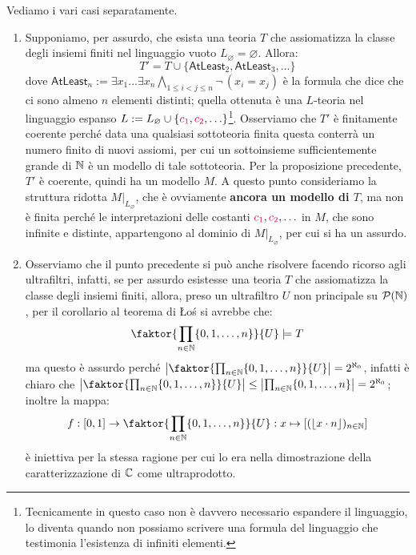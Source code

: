 \begin{soln}
    Vediamo i vari casi separatamente.
    \begin{enumerate}
        \item Supponiamo, per assurdo, che esista una teoria $T$ che assiomatizza la classe degli insiemi finiti nel linguaggio vuoto $L_\varnothing = \varnothing$. Allora:
        \[ T' = T \cup \{\mathsf{AtLeast}_2, \mathsf{AtLeast}_3, \ldots\} 
        \]
        dove $\mathsf{AtLeast}_n := \exists x_1 \ldots \exists x_n \bigwedge_{1 \leq i < j \leq n} \neg\, (x_i = x_j)$ è la formula che dice che ci sono almeno $n$ elementi distinti; quella ottenuta è una $L$-teoria nel linguaggio espanso $L := L_\varnothing \cup \{\textcolor{purple}{c_1}, \textcolor{purple}{c_2}, \ldots\}$\footnote{Tecnicamente in questo caso non è davvero necessario espandere il linguaggio, lo diventa quando non possiamo scrivere 
        una formula del linguaggio che testimonia l'esistenza di infiniti elementi.}. Osserviamo che $T'$ è finitamente coerente perché data una qualsiasi sottoteoria finita 
        questa conterrà un numero finito di nuovi assiomi, per cui un sottoinsieme sufficientemente grande di $\mathbb N$ è un modello di tale sottoteoria. Per la proposizione precedente, $T'$ è coerente, quindi ha un modello $M$. 
        A questo punto consideriamo la struttura ridotta $M|_{L_\varnothing}$, che è ovviamente \textbf{ancora un modello di $T$}, ma non è finita perché le interpretazioni delle costanti $\textcolor{purple}{c_1}, \textcolor{purple}{c_2}, \ldots$ in $M$, che sono
        infinite e distinte, appartengono al dominio di $M|_{L_\varnothing}$, per cui si ha un assurdo.
        \item[1$'$.] Osserviamo che il punto precedente si può anche risolvere facendo ricorso agli ultrafiltri, infatti, se per assurdo esistesse una teoria $T$ che assiomatizza la classe degli insiemi finiti, allora, preso un ultrafiltro $U$ non principale su $\mathcal{P}(\mathbb N)$, per il corollario al teorema di Łoś si avrebbe che:
        \[ \faktor{\prod_{n \in \NN} \{0,1,\ldots,n\}}{U} \models T
        \]
        ma questo è assurdo perché $\left| \faktor{\prod_{n \in \NN} \{0,1,\ldots,n\}}{U} \right| = 2^{\aleph_0}$, infatti è chiaro che $\left| \faktor{\prod_{n \in \NN} \{0,1,\ldots,n\}}{U} \right| \leq \left| \prod_{n \in \NN} \{0,1,\ldots,n\} \right| = 2^{\aleph_0}$; inoltre la mappa:
        \[ f : [0,1] \to \faktor{\prod_{n \in \NN} \{0,1,\ldots,n\}}{U} : x \mapsto [(\floor{x \cdot n})_{n \in \NN}] \]
        è iniettiva per la stessa ragione per cui lo era nella dimostrazione della caratterizzazione di $\mathbb C$ come ultraprodotto.

\end{enumerate}
\end{soln}
